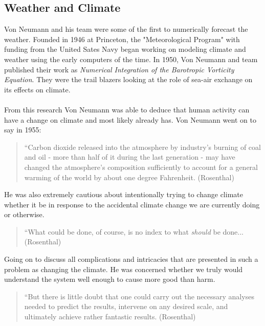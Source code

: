 \documentclass[12pt]{article}
\begin{document}
\subsection*{Weather and Climate}
	Von Neumann and his team were some of the first to numerically forecast the weather. Founded in 1946 at Princeton, the "Meteorological Program" with funding from the United Sates Navy began working on modeling climate and weather using the early computers of the time. In 1950, Von Neumann and team published their work as \textit{Numerical Integration of the Barotropic Vorticity Equation}. They were the trail blazers looking at the role of sea-air exchange on its effects on climate.\\
	\\
	From this research Von Neumann was able to deduce that human activity can have a change on climate and most likely already has. Von Neumann went on to say in 1955:
	\begin{quotation}
		``Carbon dioxide released into the atmosphere by industry's burning of coal and oil - more than half of it during the last generation - may have changed the atmosphere's composition sufficiently to account for a general warming of the world by about one degree Fahrenheit. (Rosenthal)
	\end{quotation}
	He was also extremely cautious about intentionally trying to change climate whether it be in response to the accidental climate change we are currently doing or otherwise.
	\begin{quotation}
		``What could be done, of course, is no index to what \textit{should} be done... (Rosenthal)
	\end{quotation}
	Going on to discuss all complications and intricacies that are presented in such a problem as changing the climate. He was concerned whether we truly would understand the system well enough to cause more good than harm.
	\begin{quotation}
		``But there is little doubt that one could carry out the necessary analyses needed to predict the results, intervene on any desired scale, and ultimately achieve rather fantastic results. (Rosenthal)
	\end{quotation}
\end{document}
